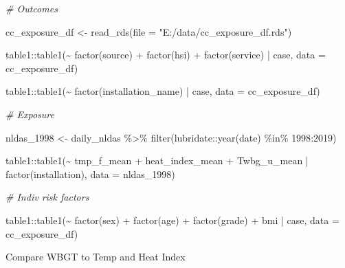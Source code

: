 \documentclass[
]{article}
\newenvironment{Shaded}{\begin{snugshade}}{\end{snugshade}}
\newcommand{\AttributeTok}[1]{\textcolor[rgb]{0.77,0.63,0.00}{#1}}
\newcommand{\CommentTok}[1]{\textcolor[rgb]{0.56,0.35,0.01}{\textit{#1}}}
\newcommand{\DecValTok}[1]{\textcolor[rgb]{0.00,0.00,0.81}{#1}}
\newcommand{\FunctionTok}[1]{\textcolor[rgb]{0.00,0.00,0.00}{#1}}
\newcommand{\NormalTok}[1]{#1}
\newcommand{\OtherTok}[1]{\textcolor[rgb]{0.56,0.35,0.01}{#1}}
\newcommand{\SpecialCharTok}[1]{\textcolor[rgb]{0.00,0.00,0.00}{#1}}
\newcommand{\StringTok}[1]{\textcolor[rgb]{0.31,0.60,0.02}{#1}}
\begin{document}
\begin{Shaded}
\begin{Highlighting}[]
\CommentTok{\# Outcomes }

\NormalTok{cc\_exposure\_df }\OtherTok{\textless{}{-}}
  \FunctionTok{read\_rds}\NormalTok{(}\AttributeTok{file =} \StringTok{"E:/data/cc\_exposure\_df.rds"}\NormalTok{)}

\NormalTok{table1}\SpecialCharTok{::}\FunctionTok{table1}\NormalTok{(}\SpecialCharTok{\textasciitilde{}} \FunctionTok{factor}\NormalTok{(source) }\SpecialCharTok{+} \FunctionTok{factor}\NormalTok{(hsi) }\SpecialCharTok{+} \FunctionTok{factor}\NormalTok{(service) }\SpecialCharTok{|}\NormalTok{ case, }\AttributeTok{data =}\NormalTok{ cc\_exposure\_df)}


\NormalTok{table1}\SpecialCharTok{::}\FunctionTok{table1}\NormalTok{(}\SpecialCharTok{\textasciitilde{}} \FunctionTok{factor}\NormalTok{(installation\_name) }\SpecialCharTok{|}\NormalTok{ case, }\AttributeTok{data =}\NormalTok{ cc\_exposure\_df)}


\CommentTok{\# Exposure}

\NormalTok{nldas\_1998 }\OtherTok{\textless{}{-}}\NormalTok{ daily\_nldas }\SpecialCharTok{\%\textgreater{}\%} 
  \FunctionTok{filter}\NormalTok{(lubridate}\SpecialCharTok{::}\FunctionTok{year}\NormalTok{(date) }\SpecialCharTok{\%in\%} \DecValTok{1998}\SpecialCharTok{:}\DecValTok{2019}\NormalTok{)}

\NormalTok{table1}\SpecialCharTok{::}\FunctionTok{table1}\NormalTok{(}\SpecialCharTok{\textasciitilde{}}\NormalTok{ tmp\_f\_mean }\SpecialCharTok{+}\NormalTok{ heat\_index\_mean }\SpecialCharTok{+}\NormalTok{ Twbg\_u\_mean }\SpecialCharTok{|} \FunctionTok{factor}\NormalTok{(installation), }\AttributeTok{data =}\NormalTok{ nldas\_1998)}

\CommentTok{\# Indiv risk factors}

\NormalTok{table1}\SpecialCharTok{::}\FunctionTok{table1}\NormalTok{(}\SpecialCharTok{\textasciitilde{}} \FunctionTok{factor}\NormalTok{(sex) }\SpecialCharTok{+} \FunctionTok{factor}\NormalTok{(age) }\SpecialCharTok{+} \FunctionTok{factor}\NormalTok{(grade) }\SpecialCharTok{+}\NormalTok{ bmi }\SpecialCharTok{|}\NormalTok{ case, }\AttributeTok{data =}\NormalTok{ cc\_exposure\_df)}
\end{Highlighting}
\end{Shaded}

Compare WBGT to Temp and Heat Index
\end{document}
